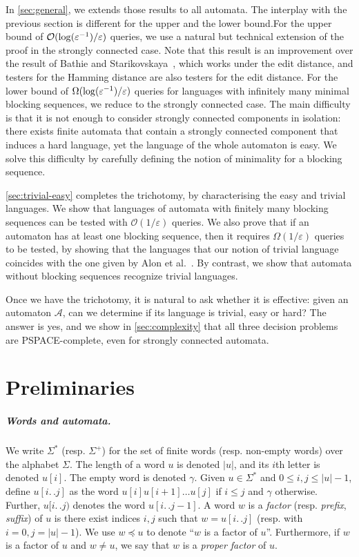 \documentclass[letterpaper, USenglish, cleveref, autoref, thm-restate, numberwithinsect]{lipics-v2021}
\theoremstyle{theorem}
\theoremstyle{definition}
\newcommand{\Aa}{\mathcal{A}}
\newcommand{\cO}{\mathcal{O}}
\newcommand{\dd}{.\,.}
\newcommand{\emptyw}{\gamma}
\newcommand{\eps}{\varepsilon}
\newcommand{\factor}{\preccurlyeq}
\newcommand{\PSPACE}{\textsf{PSPACE}\xspace}
\newcommand{\epslogeps}[1][]
{\ifthenelse{\equal{#1}{}}{\log(\eps^{-1})/\eps}{\log^{ #1 }(\eps^{-1})/\eps}}
\begin{document}
In \cref{sec:general}, we extends those results to all automata. The interplay with the previous section is different for the upper and the lower bound.For the upper bound of $\cO(\epslogeps)$ queries, we use a natural but technical extension of the proof in the strongly connected case. 
Note that this result is an improvement over the result of Bathie and Starikovskaya~\cite{bathie2021property}, which works under the edit distance, and testers for the Hamming distance are also testers for the edit distance.
For the lower bound of $\Omega(\epslogeps)$ queries for languages with infinitely many minimal blocking sequences, we reduce to the strongly connected case. The main difficulty is that it is not enough to consider strongly connected components in isolation: there exists finite automata that contain a strongly connected component that induces a hard language, yet the language of the whole automaton is easy. We solve this difficulty by carefully defining the notion of minimality for a blocking sequence.

\cref{sec:trivial-easy} completes the trichotomy, by characterising the easy and trivial languages.
We show that languages of automata with finitely many blocking sequences can be tested with $\cO(1/\eps)$ queries.
We also prove that if an automaton has at least one blocking sequence, then it requires $\Omega(1/\eps)$ queries to be tested, by showing that the languages that our notion of trivial language coincides with the one given by Alon et al.~\cite{alon2001regular}.
By contrast, we show that automata without blocking sequences recognize trivial languages.

Once we have the trichotomy, it is natural to ask whether it is effective: given an automaton $\Aa$, can we determine if its language is trivial, easy or hard? 
The answer is yes, and we show in \cref{sec:complexity} that all three decision problems are \PSPACE-complete, even for strongly connected automata.
 
\section{Preliminaries}
\label{sec:preliminaries}
\subparagraph*{Words and automata.}
We write $\Sigma^*$ (resp. $\Sigma^+$) for the set of finite words (resp. non-empty words) over the alphabet $\Sigma$.
The length of a word $u$ is denoted $|u|$, and its $i$th letter is denoted $u[i]$. The empty word is denoted $\emptyw$.
Given $u\in\Sigma^*$ and $0\le i, j \le |u|-1$, define $u[i\dd j]$ as the word $u[i]u[i+1]\ldots u[j]$ if $i\le j$ and $\emptyw$ otherwise.
Further, $u[i\dd j)$ denotes the word $u[i\dd j-1]$.
A word $w$ is a \emph{factor} (resp. \emph{prefix}, \emph{suffix}) of $u$ is there exist indices $i,j$ such that $w = u[i\dd j]$ (resp. with $i = 0, j = |u|-1$). We use $w\factor u$ to denote ``$w$ is a factor of $u$''.
Furthermore, if $w$ is a factor of $u$ and $w \neq u$, we say that $w$ is a \emph{proper factor} of $u$.
 
\end{document}

